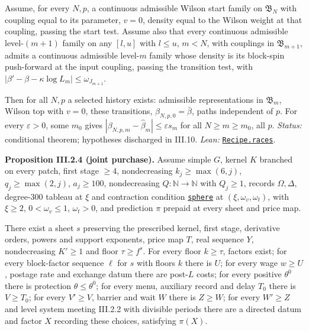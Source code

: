 \documentclass[
  letterpaper,
  11pt]{article}
\begin{document}
Assume, for every \(N,p\), a continuous admissible Wilson start family
on \(\mathfrak B_N\) with coupling equal to its parameter, \(v=0\),
density equal to the Wilson weight at that coupling, passing the start
test. Assume also that every continuous admissible level-\((m+1)\)
family on any \([l,u]\) with \(l\le u\), \(m<N\), with couplings in
\(\mathfrak B_{m+1}\), admits a continuous admissible level-\(m\) family
whose density is its block-spin push-forward at the input coupling,
passing the transition test, with
\(|\beta'-\beta-\kappa\log L_m|\le\omega_{J_{m+1}}\).

Then for all \(N,p\) a selected history exists: admissible
representations in \(\mathfrak B_m\), Wilson top with \(v=0\), these
transitions, \(\beta_{N,p,0}=\bar\beta\), paths independent of \(p\).
For every \(\varepsilon>0\), some \(m_0\) gives
\(|\beta_{N,p,m}-\hat\beta_m|\le\varepsilon s_m\) for all
\(N\ge m\ge m_0\), all \(p\). \emph{Status:} conditional theorem;
hypotheses discharged in III.10. \emph{Lean:}
\href{https://github.com/yang-mills-group/OpenAI-YM-20261028/blob/3456e5e75cf8d4cd558955a5c7638fba2d68f464/YM/Shoot/Race.lean\#L67-L82}{\texttt{Recipe.races}}.

\textbf{Proposition III.2.4 (joint purchase).} Assume simple \(G\),
kernel \(K\) branched on every patch, first stage \(\ge4\),
nondecreasing \(k_j\ge\max(6,j)\), \(q_j\ge\max(2,j)\), \(a_j\ge100\),
nondecreasing \(Q:\mathbb N\to\mathbb N\) with \(Q_j\ge1\), records
\(\Omega,\Delta\), degree-\(300\) tableau at \(\xi\) and contraction
condition
\href{https://github.com/yang-mills-group/OpenAI-YM-20261028/blob/3456e5e75cf8d4cd558955a5c7638fba2d68f464/YM/FullVolume/Sym/Purse.lean\#L29}{\texttt{sphere}}
at \((\xi,\omega_v,\omega_t)\), with \(\xi\ge2\), \(0<\omega_v\le1\),
\(\omega_t>0\), and prediction \(\pi\) prepaid at every sheet and price
map.

There exist a sheet \(s\) preserving the prescribed kernel, first stage,
derivative orders, powers and support exponents, price map \(T\), real
sequence \(Y\), nondecreasing \(K'\ge1\) and floor \(\tau\ge f^s\). For
every floor \(k\ge\tau\), factors exist; for every block-factor sequence
\(\ell\) for \(s\) with floors \(k\) there is \(U\); for every wage
\(w\ge U\), postage rate and exchange datum there are post-\(L\) costs;
for every positive \(\theta^0\) there is protection
\(\theta\le\theta^0\); for every menu, auxiliary record and delay
\(T_0\) there is \(V\ge T_0\); for every \(V'\ge V\), barrier and wait
\(W\) there is \(Z\ge W\); for every \(W'\ge Z\) and level system
meeting III.2.2 with divisible periods there are a directed datum and
factor \(X\) recording these choices, satisfying \(\pi(X)\).
\end{document}
